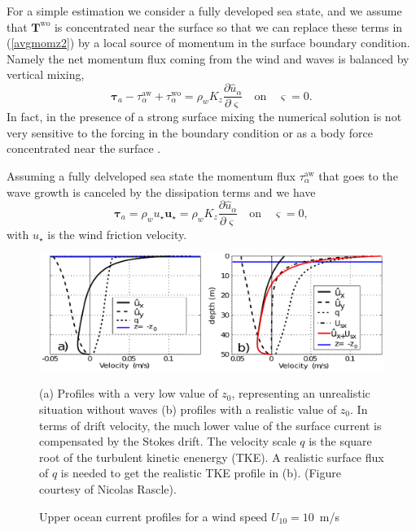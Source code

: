 For a simple estimation we consider a fully developed sea state, and we assume that   ${\mathbf
T}^{\mathrm{wo}}$ is concentrated near the surface so that  
we can replace these terms in 
(\ref{avgmomz2}) by a local source of momentum in the surface boundary condition. Namely the net momentum flux coming from the wind and waves is balanced by vertical mixing, 
\begin{equation}
{\mathbf \tau}_a - \tau_{\alpha}^{\mathrm{aw}} + \tau_{\alpha}^{\mathrm{wo}}=
 \rho_w K_z \frac{\partial
\widehat{u}_\alpha}{\partial \varsigma} \quad \textrm{on} \quad \varsigma =0.  \label{surfstress3}
\end{equation}
In fact, in the presence of a strong surface mixing the numerical solution is not very sensitive to the forcing in the boundary condition 
or as a body force concentrated near the surface \citep{Rascle&al.2013}. 

Assuming a fully delveloped sea state the momentum flux $\tau_{\alpha}^{\mathrm{aw}} $  that goes to the wave growth is canceled 
by the dissipation terms and we have
\begin{equation}
{\mathbf \tau}_a  = \rho_w u_\star {\mathbf u}_\star = \rho_w K_z
\frac{\partial \widehat{u}_\alpha}{\partial \varsigma} \quad \textrm{on} \quad
\varsigma = 0, \label{surfstress4}
\end{equation}
with $u_\star$ is the wind friction velocity.

\begin{figure}
\centerline{\includegraphics[width=\textwidth]{FIGS_CH_AIRSEA/profil1_en.pdf}}
  \caption{Upper ocean current profiles for a wind speed $U_{10}=10$~m/s}
 {(a) Profiles with a very low value of $z_0$, representing an unrealistic situation without waves 
  (b) profiles with a realistic value of $z_0$. In terms of drift velocity, the much lower value of the surface current is compensated 
  by the Stokes drift.  The velocity scale $q$ is the square root of the turbulent kinetic enenergy (TKE). A realistic surface flux of $q$ is
  needed to get the realistic TKE profile in (b).  (Figure courtesy  of Nicolas Rascle).} \label{fig:2}
\end{figure}

